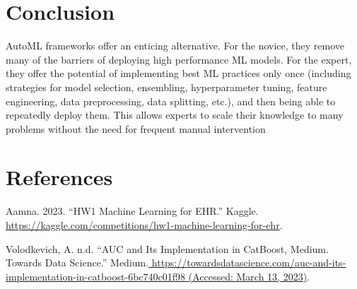 \documentclass[
]{article}
\newlength{\cslhangindent}
\newlength{\cslentryspacingunit} %
\newenvironment{CSLReferences}[2] %
 {%
  \setlength{\parindent}{0pt}
  \ifodd #1
  \let\oldpar\par
  \def\par{\hangindent=\cslhangindent\oldpar}
  \fi
  \setlength{\parskip}{#2\cslentryspacingunit}
 }%
 {}
\begin{document}
\hypertarget{conclusion}{%
\section{Conclusion}\label{conclusion}}

AutoML frameworks offer an enticing alternative. For the novice, they
remove many of the barriers of deploying high performance ML models. For
the expert, they offer the potential of implementing best ML practices
only once (including strategies for model selection, ensembling,
hyperparameter tuning, feature engineering, data preprocessing, data
splitting, etc.), and then being able to repeatedly deploy them. This
allows experts to scale their knowledge to many problems without the
need for frequent manual intervention

\newpage

\hypertarget{references}{%
\section*{References}\label{references}}

\hypertarget{refs}{}
\begin{CSLReferences}{1}{0}
\leavevmode{}%
Aamna. 2023. {``HW1 Machine Learning for EHR.''} Kaggle.
\url{https://kaggle.com/competitions/hw1-machine-learning-for-ehr}.

\leavevmode{}%
Volodkevich, A. n.d. {``AUC and Its Implementation in CatBoost, Medium.
Towards Data Science.''}
Medium.\href{\%20https://towardsdatascience.com/auc-and-its-implementation-in-catboost-6bc740c01f98\%20(Accessed:\%20March\%2013,\%202023)}{
https://towardsdatascience.com/auc-and-its-implementation-in-catboost-6bc740c01f98
(Accessed: March 13, 2023)}.

\end{CSLReferences}
\end{document}
